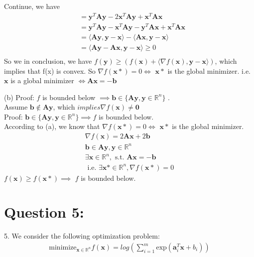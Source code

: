 \documentclass[a4paper,12pt]{article}
\newcommand{\R}{\mathbb{R}}
\begin{document}
Continue, we have
\begin{align*}
    &= \bm{y}^T\bm{A}\bm{y} - 2\bm{x}^T\bm{A}\bm{y} + \bm{x}^T\bm{A}\bm{x}  \\
    &= \bm{y}^T\bm{A}\bm{y} - \bm{x}^T\bm{A}\bm{y} - \bm{y}^T\bm{A}\bm{x} + \bm{x}^T\bm{A}\bm{x} \\
    &= \langle \bm{A}\bm{y}, \bm{y} - \bm{x}\rangle - \langle \bm{A}\bm{x}, \bm{y} - \bm{x} \rangle \\
    &= \langle \bm{A}\bm{y} - \bm{A}\bm{x}, \bm{y} - \bm{x} \rangle \geq 0 \\
\end{align*}
So we in conclusion, we have \(f(\bm{y}) \geq (f(\bm{x} )+ \langle \nabla f(\bm{x}), \bm{y} - \bm{x}\rangle)\), which implies that f(x) is convex.
So \(\nabla f(\bm{x}*) = 0 \iff\) \(\bm{x}*\) is the global minimizer. i.e. \\
\(\bm{x}\) is a global minimizer \( \iff \bm{A}\bm{x} = -\bm{b}\)

(b) 
Proof: \(f\) is bounded below \(\implies \bm{b} \in \{\bm{A}\bm{y}, \bm{y} \in \R^n\}\) .   \\
Assume \(\bm{b} \notin \bm{A}\bm{y}\), which \(implies \nabla f(\bm{x}) \neq \bm{0}\)\\


Proof: \(\bm{b} \in \{\bm{A}\bm{y}, \bm{y} \in \R^n\}\implies f\) is bounded below.   \\
According to (a), we know that \(\nabla f(\bm{x}*) = 0 \iff\) \(\bm{x}*\) is the global minimizer. \\
\begin{align*}
    \nabla f(\bm{x}) = 2\bm{A}\bm{x} + 2\bm{b}\\ 
    \bm{b} \in \bm{A}\bm{y}, \bm{y} \in \R^n \\
    \exists \bm{x} \in \R^n, \text{ s.t. } \bm{A}\bm{x} = -\bm{b}\\
    \text{ i.e. } \exists \bm{x}* \in \R^n, \text{} \nabla f(\bm{x}*) = 0 
\end{align*} 
\(f(\bm{x}) \geq f(\bm{x}*) \implies\) \(f\) is bounded below.


\section*{Question 5:}
5. We consider the following optimization problem:
\begin{align}
    \text{minimize}_{\bm{x} \in \R^n} f(\bm{x}) = log\left( \sum_{i = 1}^m \text{exp}(\bm{a}_i^T \bm{x} + b_i)\right)
\end{align}
\end{document}
